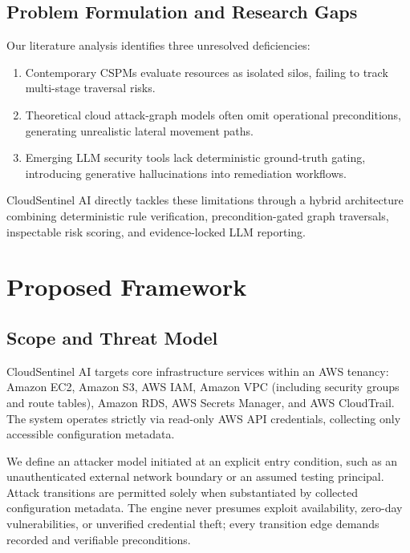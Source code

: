 \documentclass[conference]{IEEEtran}
\begin{document}
\subsection{Problem Formulation and Research Gaps}
Our literature analysis identifies three unresolved deficiencies:
\begin{enumerate}
\item Contemporary CSPMs evaluate resources as isolated silos, failing to track multi-stage traversal risks.
\item Theoretical cloud attack-graph models often omit operational preconditions, generating unrealistic lateral movement paths.
\item Emerging LLM security tools lack deterministic ground-truth gating, introducing generative hallucinations into remediation workflows.
\end{enumerate}
CloudSentinel AI directly tackles these limitations through a hybrid architecture combining deterministic rule verification, precondition-gated graph traversals, inspectable risk scoring, and evidence-locked LLM reporting.

\section{Proposed Framework}

\subsection{Scope and Threat Model}
CloudSentinel AI targets core infrastructure services within an AWS tenancy: Amazon EC2, Amazon S3, AWS IAM, Amazon VPC (including security groups and route tables), Amazon RDS, AWS Secrets Manager, and AWS CloudTrail. The system operates strictly via read-only AWS API credentials, collecting only accessible configuration metadata.

We define an attacker model initiated at an explicit entry condition, such as an unauthenticated external network boundary or an assumed testing principal. Attack transitions are permitted solely when substantiated by collected configuration metadata. The engine never presumes exploit availability, zero-day vulnerabilities, or unverified credential theft; every transition edge demands recorded and verifiable preconditions.
\end{document}

